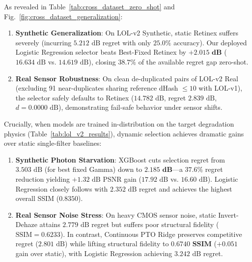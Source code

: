\documentclass[journal]{IEEEtran}
\begin{document}
As revealed in Table~\ref{tab:cross_dataset_zero_shot} and Fig.~\ref{fig:cross_dataset_generalization}:
\begin{enumerate}
    \item \textbf{Synthetic Generalization}: On LOL-v2 Synthetic, static Retinex suffers severely (incurring $5.212\text{ dB}$ regret with only $25.0\%$ accuracy). Our deployed Logistic Regression selector beats Best-Fixed Retinex by $\mathbf{+2.015\text{ dB}}$ ($16.634\text{ dB}$ vs. $14.619\text{ dB}$), closing $\mathbf{38.7\%}$ of the available regret gap zero-shot.
    \item \textbf{Real Sensor Robustness}: On clean de-duplicated pairs of LOL-v2 Real (excluding 91 near-duplicates sharing reference dHash $\le 10$ with LOL-v1), the selector safely defaults to Retinex ($14.782\text{ dB}$, regret $2.839\text{ dB}$, $d = 0.0000\text{ dB}$), demonstrating fail-safe behavior under sensor shifts.
\end{enumerate}

Crucially, when models are trained in-distribution on the target degradation physics (Table~\ref{tab:lol_v2_results}), dynamic selection achieves dramatic gains over static single-filter baselines:
\begin{enumerate}
    \item \textbf{Synthetic Photon Starvation}: XGBoost cuts selection regret from $3.503\text{ dB}$ (for best fixed Gamma) down to $\mathbf{2.185\text{ dB}}$—a $\mathbf{37.6\%}$ regret reduction yielding $+1.32\text{ dB}$ PSNR gain ($17.92\text{ dB}$ vs. $16.60\text{ dB}$). Logistic Regression closely follows with $2.352\text{ dB}$ regret and achieves the highest overall SSIM ($\mathbf{0.8350}$).
    \item \textbf{Real Sensor Noise Stress}: On heavy CMOS sensor noise, static Invert-Dehaze attains $2.779\text{ dB}$ regret but suffers poor structural fidelity ($\text{SSIM}=0.6233$). In contrast, Continuous PTO Ridge preserves competitive regret ($2.801\text{ dB}$) while lifting structural fidelity to $\mathbf{0.6740\text{ SSIM}}$ ($+0.051$ gain over static), with Logistic Regression achieving $3.242\text{ dB}$ regret.
\end{enumerate}
\end{document}
